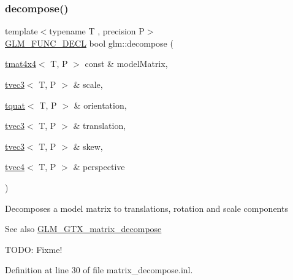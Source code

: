 \subsubsection{\texorpdfstring{decompose()}{decompose()}}
{\footnotesize\ttfamily template$<$typename T , precision P$>$ \\
\mbox{\hyperlink{setup_8hpp_ab2d052de21a70539923e9bcbf6e83a51}{G\+L\+M\+\_\+\+F\+U\+N\+C\+\_\+\+D\+E\+CL}} bool glm\+::decompose (\begin{DoxyParamCaption}\item[{\mbox{\hyperlink{structglm_1_1tmat4x4}{tmat4x4}}$<$ T, P $>$ const \&}]{model\+Matrix,  }\item[{\mbox{\hyperlink{structglm_1_1tvec3}{tvec3}}$<$ T, P $>$ \&}]{scale,  }\item[{\mbox{\hyperlink{structglm_1_1tquat}{tquat}}$<$ T, P $>$ \&}]{orientation,  }\item[{\mbox{\hyperlink{structglm_1_1tvec3}{tvec3}}$<$ T, P $>$ \&}]{translation,  }\item[{\mbox{\hyperlink{structglm_1_1tvec3}{tvec3}}$<$ T, P $>$ \&}]{skew,  }\item[{\mbox{\hyperlink{structglm_1_1tvec4}{tvec4}}$<$ T, P $>$ \&}]{perspective }\end{DoxyParamCaption})}

Decomposes a model matrix to translations, rotation and scale components \begin{DoxySeeAlso}{See also}
\mbox{\hyperlink{group__gtx__matrix__decompose}{G\+L\+M\+\_\+\+G\+T\+X\+\_\+matrix\+\_\+decompose}} 
\end{DoxySeeAlso}
T\+O\+DO\+: Fixme! 

Definition at line 30 of file matrix\+\_\+decompose.\+inl.

